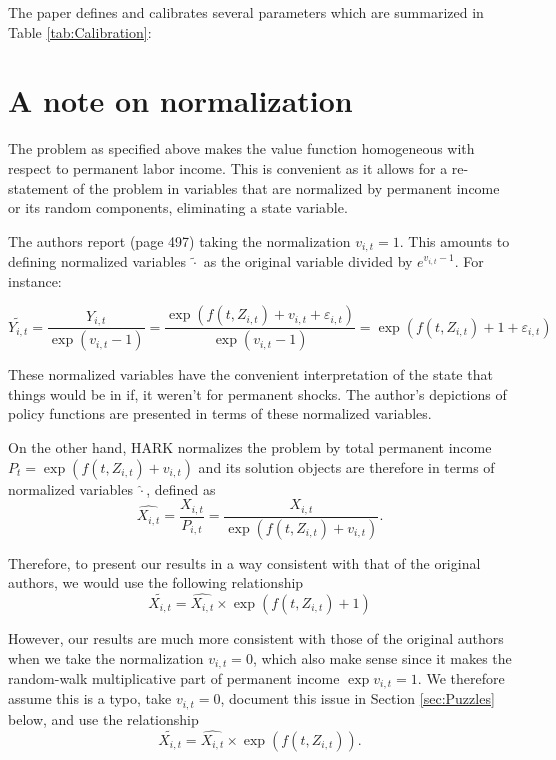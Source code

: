 \documentclass[./CGMPort.tex]{subfiles}
\begin{document}
The paper defines and calibrates several parameters which are summarized in Table \ref{tab:Calibration}:



\hypertarget{Normalization}{}
\section{A note on normalization}

The problem as specified above makes the value function homogeneous with respect to permanent labor income. This is convenient as it allows for a re-statement of the problem in variables that are normalized by permanent income or its random components, eliminating a state variable.

The authors report (page 497) taking the normalization $v_{i,t} = 1$. This amounts to defining normalized variables $\tilde{\cdot}$ as the original variable divided by $e^{v_{i,t}-1}$. For instance:

\begin{equation}
\tilde{Y_{i,t}} = \frac{Y_{i,t}}{\exp(v_{i,t}-1)} = \frac{\exp (f(t,Z_{i,t}) + v_{i,t} + \varepsilon_{i,t})}{\exp(v_{i,t}-1)} = \exp( f(t,Z_{i,t}) + 1 + \varepsilon_{i,t} )
\end{equation}

These normalized variables have the convenient interpretation of the state that things would be in if, it weren't for permanent shocks. The author's depictions of policy functions are presented in terms of these normalized variables.

On the other hand, HARK normalizes the problem by total permanent income $P_t = \exp (f(t,Z_{i,t}) + v_{i,t})$ and its solution objects are therefore in terms of normalized variables $\hat{\cdot}$, defined as
\begin{equation}
\hat{X_{i,t}} = \frac{X_{i,t}}{P_{i,t}} = \frac{X_{i,t}}{\exp (f(t,Z_{i,t}) + v_{i,t})}.
\end{equation}

Therefore, to present our results in a way consistent with that of the original authors, we would use the following relationship
\begin{equation}
\tilde{X_{i,t}} = \hat{X_{i,t}} \times \exp (f(t,Z_{i,t})+1)
\end{equation}

However, our results are much more consistent with those of the original authors when we take the normalization $v_{i,t} = 0$, which also make sense since it makes the random-walk multiplicative part of permanent income $\exp{v_{i,t}}=1$. We therefore assume this is a typo, take $v_{i,t} = 0$, document this issue in Section \ref{sec:Puzzles} below, and use the relationship
\begin{equation}
\tilde{X_{i,t}} = \hat{X_{i,t}} \times \exp (f(t,Z_{i,t})).
\end{equation}
\end{document}

